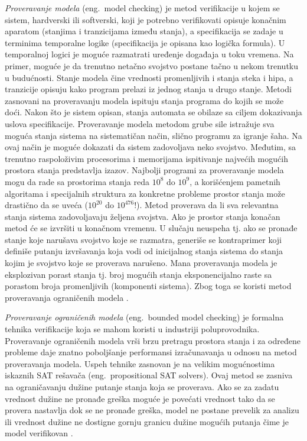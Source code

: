 \documentclass[12pt,oneside]{memoir}
\begin{document}
\textit{Proveravanje modela} (eng.~model checking) je metod verifikacije u kojem se sistem, hardverski ili softverski, koji je potrebno verifikovati opisuje konačnim aparatom (stanjima i tranzicijama između stanja), a specifikacija se zadaje u terminima temporalne logike (specifikacija je opisana kao logička formula). U temporalnoj logici je moguće razmatrati uređenje događaja u toku vremena. Na primer, moguće je da trenutno netačno svojstvo postane tačno u nekom trenutku u budućnosti. Stanje modela čine vrednosti promenljivih i stanja steka i hipa, a tranzicije opisuju kako program prelazi iz jednog stanja u drugo stanje. Metodi zasnovani na proveravanju modela ispituju stanja programa do kojih se može doći. Nakon što je sistem opisan, stanja automata se obilaze sa ciljem dokazivanja uslova specifikacije. Proveravanje modela metodom grube sile istražuje sva moguća stanja sistema na sistematičan način, slično programu za igranje šaha. Na ovaj način je moguće dokazati da sistem zadovoljava neko svojstvo. Međutim, sa trenutno raspoloživim procesorima i memorijama ispitivanje najvećih mogućih prostora stanja predstavlja izazov. Najbolji programi za proveravanje modela mogu da rade sa prostorima stanja reda $10^8$ do $10^9$, a korišćenjem pametnih algoritama i specijalnih struktura za konkretne probleme prostor stanja može drastično da se uveća ($10^{20}$ do $10^{476}$!). Metod proverava da li sva relevantna stanja sistema zadovoljavaju željena svojstva. Ako je prostor stanja konačan metod će se izvršiti u konačnom vremenu. U slučaju neuspeha tj. ako se pronađe stanje koje narušava svojstvo koje se razmatra, generiše se kontraprimer koji definiše putanju izvršavanja koja vodi od inicijalnog stanja sistema do stanja kojim je svojstvo koje se proverava narušeno. Mana proveravanja modela je eksplozivan porast stanja tj. broj mogućih stanja eksponencijalno raste sa porastom broja promenljivih (komponenti sistema). Zbog toga se koristi metod proveravanja ograničenih modela \cite{mvj, AutoTechnFormSofVer, BMCUSS, PoMC}.

\textit{Proveravanje ograničenih modela} (eng.~bounded model checking)  je formalna tehnika verifikacije koja se mahom koristi u industriji poluprovodnika. Proveravanje ograničenih modela vrši brzu pretragu prostora stanja i za određene probleme daje znatno poboljšanje performansi izračunavanja u odnosu na metod proveravanja modela. Uspeh tehnike zasnovan je na velikim mogućnostima iskaznih SAT rešavača (eng.~propositional SAT solvers). Ovaj metod se zasniva na ograničavanju dužine putanje stanja koja se proverava. Ako se za zadatu vrednost dužine ne pronađe greška moguće je povećati vrednost tako da se provera nastavlja dok se ne pronađe greška, model ne postane prevelik za analizu ili vrednost dužine ne dostigne gornju granicu dužine mogućih putanja čime je model verifikovan  \cite{mvj, AutoTechnFormSofVer, BMCUSS}.
\end{document}
